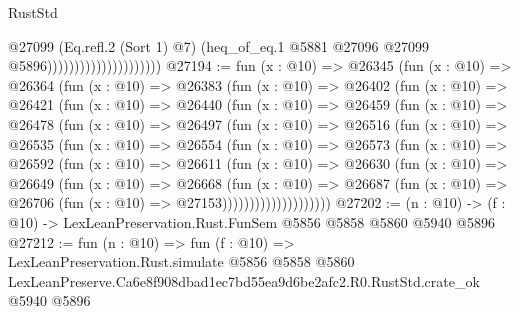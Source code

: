 \begin{lexlean}{RustStd}
\begin{coremodule}
                                            @27099
                                            (Eq.refl.{2} (Sort 1) @7)
                                            (heq_of_eq.{1}
                                              @5881
                                              @27096
                                              @27099
                                              @5896)))))))))))))))))))))
@27194 := fun (x : @10) =>
  @26345
    (fun (x : @10) =>
    @26364
      (fun (x : @10) =>
      @26383
        (fun (x : @10) =>
        @26402
          (fun (x : @10) =>
          @26421
            (fun (x : @10) =>
            @26440
              (fun (x : @10) =>
              @26459
                (fun (x : @10) =>
                @26478
                  (fun (x : @10) =>
                  @26497
                    (fun (x : @10) =>
                    @26516
                      (fun (x : @10) =>
                      @26535
                        (fun (x : @10) =>
                        @26554
                          (fun (x : @10) =>
                          @26573
                            (fun (x : @10) =>
                            @26592
                              (fun (x : @10) =>
                              @26611
                                (fun (x : @10) =>
                                @26630
                                  (fun (x : @10) =>
                                  @26649
                                    (fun (x : @10) =>
                                    @26668
                                      (fun (x : @10) =>
                                      @26687
                                        (fun (x : @10) =>
                                        @26706 (fun (x : @10) => @27153))))))))))))))))))))
@27202 := (n : @10) -> (f : @10) -> LexLeanPreservation.Rust.FunSem @5856 @5858 @5860 @5940 @5896
@27212 := fun (n : @10) =>
  fun (f : @10) =>
  LexLeanPreservation.Rust.simulate
    @5856
    @5858
    @5860
    LexLeanPreserve.Ca6e8f908dbad1ec7bd55ea9d6be2afc2.R0.RustStd.crate_ok
    @5940
    @5896
\end{coremodule}
\end{lexlean}
